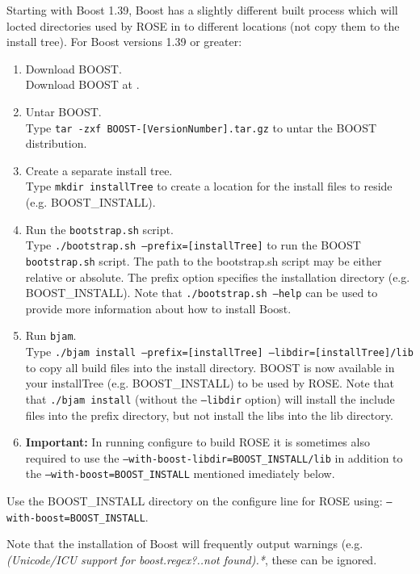Starting with Boost 1.39, Boost has a slightly different built process which
will locted directories used by ROSE in to different locations (not copy them to the
install tree). For Boost versions 1.39 or greater:
\begin{enumerate}
     \item Download BOOST. \\
       Download BOOST at .
     \item Untar BOOST. \\
       Type {\tt tar -zxf BOOST-[VersionNumber].tar.gz} to untar the BOOST distribution.
     \item Create a separate install tree. \\
           Type {\tt mkdir installTree} to create a location for the install files to reside (e.g. BOOST\_INSTALL).
     \item Run the {\tt bootstrap.sh} script. \\
           Type {\tt ./bootstrap.sh --prefix=[installTree]} 
           to run the BOOST {\tt bootstrap.sh} script.  The path to the bootstrap.sh script 
           may be either relative or absolute. The prefix option specifies the
           installation directory (e.g. BOOST\_INSTALL). Note that 
           {\tt ./bootstrap.sh --help} can be used to provide more information about how
           to install Boost.
     \item Run {\tt bjam}. \\
           Type {\tt ./bjam install --prefix=[installTree] --libdir=[installTree]/lib} to
           copy all build files into the install directory. BOOST is now available in your 
           installTree (e.g. BOOST\_INSTALL) to be used by ROSE.
           Note that that {\tt ./bjam install} (without the {\tt --libdir} option) will
           install the include files into the prefix directory, but not install the libs
           into the lib directory.
     \item {\bf Important:} In running configure to build ROSE it is sometimes also required to use the 
           {\tt --with-boost-libdir=BOOST\_INSTALL/lib} in addition to the {\tt --with-boost=BOOST\_INSTALL}
           mentioned imediately below.
\end{enumerate}

Use the BOOST\_INSTALL directory on the configure line for ROSE using: {\tt --with-boost=BOOST\_INSTALL}.


  Note that the installation of Boost will frequently output 
warnings (e.g. {\em *(Unicode/ICU support for boost.regex?..not found).*},
these can be ignored.

